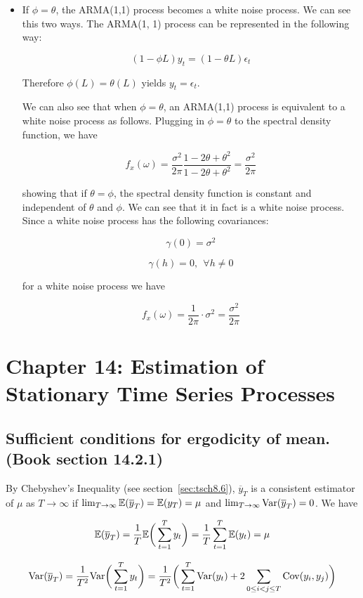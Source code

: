 \begin{itemize}
\item If \(\phi = \theta\), the ARMA(1,1) process becomes a white noise process. We can see this two ways. The ARMA(1, 1) process can be represented in the following way:

\[
(1 - \phi L)y_t = (1 - \theta L) \epsilon_t
\]

Therefore \(\phi(L) = \theta(L)\) yields \(y_t = \epsilon_t\). 


We can also see that when \(\phi = \theta\), an ARMA(1,1) process is equivalent to a white noise process as follows. Plugging in \(\phi = \theta\) to the spectral density function, we have

\[
f_x(\omega) = \frac{\sigma^2}{2\pi} \frac{1 - 2\theta + \theta^2}{1 -2\theta + \theta^2} = \frac{\sigma^2}{2\pi}
\]

showing that if \(\theta = \phi\), the spectral density function is constant and independent of \(\theta\) and \(\phi \). We can see that it in fact is a white noise process. Since a white noise process has the following covariances:

\[
\gamma(0) = \sigma^2
\]

\[
\gamma(h) =0, \ \ \forall h \neq 0
\]

for a white noise process we have

\[
f_x(\omega) = \frac{1}{2\pi} \cdot \sigma^2 = \frac{\sigma^2}{2 \pi}
\]


\end{itemize}

%
%
%
%
%
%
\section{Chapter 14: Estimation of Stationary Time Series Processes}

\subsection{Sufficient conditions for ergodicity of mean. (Book section 14.2.1)} By Chebyshev's Inequality (see section~\ref{sec:tsch8.6}), \(\overline{y}_T\) is a consistent estimator of \(\mu\) as \(T \to \infty\) if \(\lim_{T \to \infty} \mathbb{E}(\overline{y}_T) = \mathbb{E}(y_T) = \mu\) and \(\lim_{T \to \infty} \mathrm{Var}(\overline{y}_T) = 0\). We have

\[
\mathbb{E}(\overline{y}_T) = \frac{1}{T} \mathbb{E} \bigg( \sum_{t=1}^T y_t \bigg) = \frac{1}{T}  \sum_{t=1}^T \mathbb{E} (y_t) = \mu
\]

\[
\mathrm{Var}(\overline{y}_T) = \frac{1}{T^2} \mathrm{Var} \bigg( \sum_{t=1}^T y_t \bigg) = \frac{1}{T^2} \bigg(\sum_{t=1}^T  \mathrm{Var}(y_t) + 2 \sum_{0 \leq i < j \leq T } \mathrm{Cov}(y_i, y_j)   \bigg)
\]

